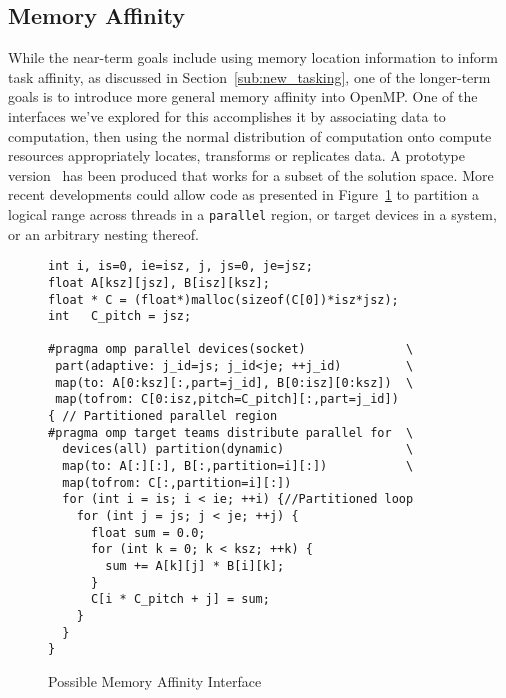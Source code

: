 \subsection{Memory Affinity}
\label{sub:memory_affinity}


While the near-term goals include using memory location information to inform
task affinity, as discussed in Section~\ref{sub:new_tasking}, one of the
longer-term goals is to introduce more general memory affinity into OpenMP.  One
of the interfaces we've explored for this accomplishes it by associating data to
computation, then using the normal distribution of computation onto compute
resources appropriately locates, transforms or replicates data.  A prototype
version~\cite{ctsar-tpds,scogland:7Hpt64iV} has been produced that works for a
subset of the solution space.  More recent developments could allow code as presented
in Figure~\ref{fig:atsar-gemm} to partition a logical range across threads in a
\texttt{parallel} region, or target devices in a system, or an arbitrary nesting
thereof.

\begin{figure}
  \begin{verbatim}
int i, is=0, ie=isz, j, js=0, je=jsz;
float A[ksz][jsz], B[isz][ksz];
float * C = (float*)malloc(sizeof(C[0])*isz*jsz);
int   C_pitch = jsz;

#pragma omp parallel devices(socket)              \
 part(adaptive: j_id=js; j_id<je; ++j_id)         \
 map(to: A[0:ksz][:,part=j_id], B[0:isz][0:ksz])  \
 map(tofrom: C[0:isz,pitch=C_pitch][:,part=j_id])
{ // Partitioned parallel region
#pragma omp target teams distribute parallel for  \
  devices(all) partition(dynamic)                 \
  map(to: A[:][:], B[:,partition=i][:])           \
  map(tofrom: C[:,partition=i][:])
  for (int i = is; i < ie; ++i) {//Partitioned loop
    for (int j = js; j < je; ++j) {
      float sum = 0.0;
      for (int k = 0; k < ksz; ++k) {
        sum += A[k][j] * B[i][k];
      }
      C[i * C_pitch + j] = sum;
    }
  }
}
\end{verbatim}
\caption{Possible Memory Affinity Interface\label{fig:atsar-gemm}}
\end{figure}

